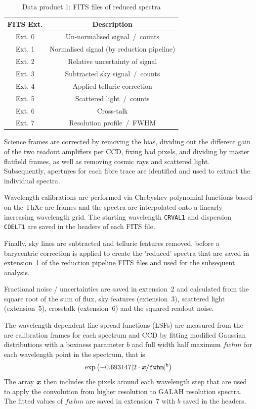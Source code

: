\documentclass[
  journal=pasa,
  manuscript=research-paper, %
  year=2023,
  volume=37
]{cup-journal}
\begin{document}
\begin{table}
    \centering
    \caption{Data product 1: FITS files of reduced spectra}
    \label{tab:reduction_fits}
    \begin{tabular}{cc}
    \hline \hline
    FITS Ext. & Description \\
    \hline
    Ext. 0 & Un-normalised signal~/~counts \\
    Ext. 1 & Normalised signal (by reduction pipeline) \\
    Ext. 2 & Relative uncertainty of signal \\
    Ext. 3 & Subtracted sky signal~/~counts \\
    Ext. 4 & Applied telluric correction \\
    Ext. 5 & Scattered light~/~counts \\
    Ext. 6 & Cross-talk \\
    Ext. 7 & Resolution profile~/~FWHM \\
    \hline
    \end{tabular}
\end{table}

Science frames are corrected by removing the bias, dividing out the different gain of the two readout amplifiers per CCD, fixing bad pixels, and dividing by master flatfield frames, as well as removing cosmic rays and scattered light. Subsequently, apertures for each fibre trace are identified and used to extract the individual spectra. 

Wavelength calibrations are performed via Chebyshev polynomial functions based on the ThXe arc frames and the spectra are interpolated onto a linearly increasing wavelength grid. The starting wavelength \texttt{CRVAL1} and dispersion \texttt{CDELT1} are saved in the headers of each FITS file.

Finally, sky lines are subtracted and telluric features removed, before a barycentric correction is applied to create the 'reduced' spectra that are saved in extension~1 of the reduction pipeline FITS files and used for the subsequent analysis. 

Fractional noise / uncertainties are saved in extension~2 and calculated from the square root of the sum of flux, sky features (extension~3), scattered light (extension~5), crosstalk (extension~6) and the squared readout noise.

The wavelength dependent line spread functions (LSFs) are measured from the arc calibration frames for each spectrum and CCD by fitting modified Gaussian distributions with a boxiness parameter $b$ and full width half maximum $fwhm$ for each wavelength point in the spectrum, that is
\begin{align}
    \exp \left(-0.693147 \vert 2 \cdot \textbf{\textit{x}}/\texttt{fwhm}\vert^\texttt{b}\right) \label{eq:lsf}
\end{align}
The array $\textbf{\textit{x}}$ then includes the pixels around each wavelength step that are used to apply the convolution from higher resolution to GALAH resolution spectra. The fitted values of $fwhm$ are saved in extension~7 with $b$ saved in the headers.
\end{document}
